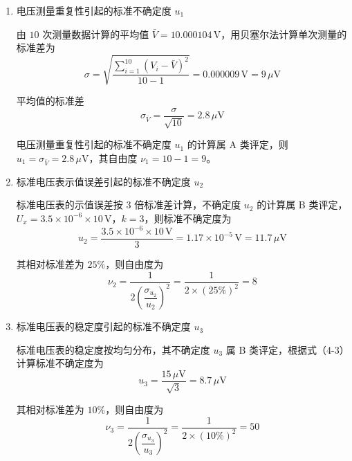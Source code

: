 \documentclass[UTF8,zihao=-4]{ctexart}
\begin{document}
\begin{enumerate}[label=(\arabic*)]
    \item 电压测量重复性引起的标准不确定度 $u_1$

    由 $10$ 次测量数据计算的平均值 $\bar{V}=10.000104\,\mathrm{V}$，用贝塞尔法计算单次测量的标准差为
    \begin{equation*}
        \sigma
        =
        \sqrt{
        \frac{\displaystyle\sum_{i=1}^{10}(V_i-\bar{V})^2}{10-1}
        }
        =
        0.000009\,\mathrm{V}
        =
        9\,\mu\mathrm{V}
    \end{equation*}

    平均值的标准差
    \begin{equation*}
        \sigma_{\bar{V}}
        =
        \frac{\sigma}{\sqrt{10}}
        =
        2.8\,\mu\mathrm{V}
    \end{equation*}

    电压测量重复性引起的标准不确定度 $u_1$ 的计算属 A 类评定，则 $u_1=\sigma_{\bar{V}}=2.8\,\mu\mathrm{V}$，其自由度 $\nu_1=10-1=9$。

    \item 标准电压表示值误差引起的标准不确定度 $u_2$

    标准电压表的示值误差按 $3$ 倍标准差计算，不确定度 $u_2$ 的计算属 B 类评定， $U_x=3.5\times10^{-6}\times10\,\mathrm{V}$，$k=3$，则标准不确定度为
    \begin{equation*}
        u_2
        =
        \frac{3.5\times10^{-6}\times10\,\mathrm{V}}{3}
        =
        1.17\times10^{-5}\,\mathrm{V}
        =
        11.7\,\mu\mathrm{V}
    \end{equation*}

    其相对标准差为 $25\%$，则自由度为
    \begin{equation*}
        \nu_2
        =
        \frac{1}{2\left(\dfrac{\sigma_{u_2}}{u_2}\right)^2}
        =
        \frac{1}{2\times(25\%)^2}
        =
        8
    \end{equation*}

    \item 标准电压表的稳定度引起的标准不确定度 $u_3$

    标准电压表的稳定度按均匀分布，其不确定度 $u_3$ 属 B 类评定，根据式（4-3）计算标准不确定度为
    \begin{equation*}
        u_3
        =
        \frac{15\,\mu\mathrm{V}}{\sqrt{3}}
        =
        8.7\,\mu\mathrm{V}
    \end{equation*}

    其相对标准差为 $10\%$，则自由度为
    \begin{equation*}
        \nu_3
        =
        \frac{1}{2\left(\dfrac{\sigma_{u_3}}{u_3}\right)^2}
        =
        \frac{1}{2\times(10\%)^2}
        =
        50
    \end{equation*}
\end{enumerate}
\end{document}
